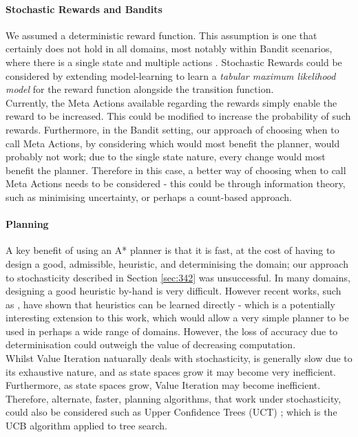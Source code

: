 \paragraph*{Stochastic Rewards and Bandits}
We assumed a deterministic reward function. This assumption is one that certainly does not hold in all domains, most notably within Bandit scenarios, where there is a single state and multiple actions \cite{lattimore}. Stochastic Rewards could be considered by extending model-learning to learn a \textit{tabular maximum likelihood model} for the reward function alongside the transition function.
\\Currently, the Meta Actions available regarding the rewards simply enable the reward to be increased. This could be modified to increase the probability of such rewards. Furthermore, in the Bandit setting, our approach of choosing when to call Meta Actions, by considering which would most benefit the planner, would probably not work; due to the single state nature, every change would most benefit the planner. Therefore in this case, a better way of choosing when to call Meta Actions needs to be considered - this could be through information theory, such as minimising uncertainty, or perhaps a count-based approach.

\paragraph*{Planning}
A key benefit of using an A* planner is that it is fast, at the cost of having to design a good, admissible, heuristic, and determinising the domain; our approach to stochasticity described in Section \ref{sec:342} was unsuccessful.  In many domains, designing a good heuristic by-hand is very difficult. However recent works, such as \cite{DBLP:journals/corr/abs-2107-02603}, have shown that heuristics can be learned directly - which is a potentially interesting extension to this work, which would allow a very simple planner to be used in perhaps a wide range of domains. However, the loss of accuracy due to determinisation could outweigh the value of decreasing computation.
\\Whilst Value Iteration natuarally deals with stochasticity, is generally slow due to its exhaustive nature, and as state spaces grow it may become very inefficient.
Furthermore, as state spaces grow, Value Iteration may become inefficient. Therefore, alternate, faster, planning algorithms, that work under stochasticity, could also be considered such as Upper Confidence Trees (UCT) \cite{10.1007/11871842_29}; which is the UCB algorithm \cite{auer2002finite} applied to tree search. 

